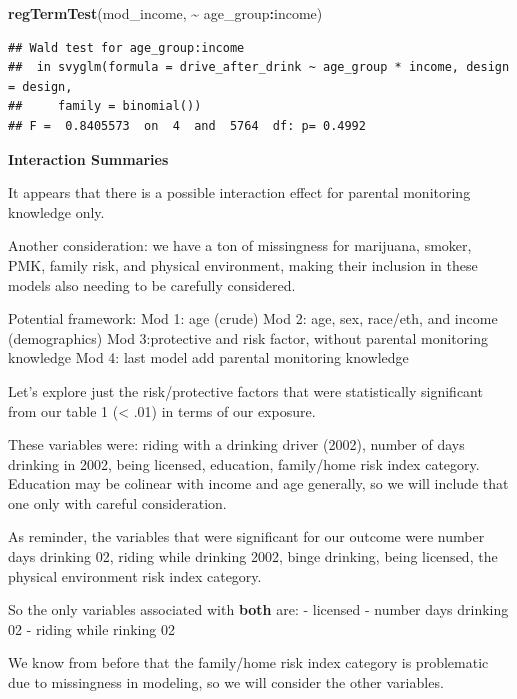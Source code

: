 \documentclass[
]{article}
\newenvironment{Shaded}{\begin{snugshade}}{\end{snugshade}}
\newcommand{\FunctionTok}[1]{\textcolor[rgb]{0.13,0.29,0.53}{\textbf{#1}}}
\newcommand{\NormalTok}[1]{#1}
\newcommand{\SpecialCharTok}[1]{\textcolor[rgb]{0.81,0.36,0.00}{\textbf{#1}}}
\begin{document}
\begin{Shaded}
\begin{Highlighting}[]
  \FunctionTok{regTermTest}\NormalTok{(mod\_income, }\SpecialCharTok{\textasciitilde{}}\NormalTok{ age\_group}\SpecialCharTok{:}\NormalTok{income)}
\end{Highlighting}
\end{Shaded}

\begin{verbatim}
## Wald test for age_group:income
##  in svyglm(formula = drive_after_drink ~ age_group * income, design = design, 
##     family = binomial())
## F =  0.8405573  on  4  and  5764  df: p= 0.4992
\end{verbatim}

\textbf{Interaction Summaries}

It appears that there is a possible interaction effect for parental
monitoring knowledge only.

Another consideration: we have a ton of missingness for marijuana,
smoker, PMK, family risk, and physical environment, making their
inclusion in these models also needing to be carefully considered.

Potential framework: Mod 1: age (crude) Mod 2: age, sex, race/eth, and
income (demographics) Mod 3:protective and risk factor, without parental
monitoring knowledge Mod 4: last model add parental monitoring knowledge

Let's explore just the risk/protective factors that were statistically
significant from our table 1 (\textless{} .01) in terms of our exposure.

These variables were: riding with a drinking driver (2002), number of
days drinking in 2002, being licensed, education, family/home risk index
category. Education may be colinear with income and age generally, so we
will include that one only with careful consideration.

As reminder, the variables that were significant for our outcome were
number days drinking 02, riding while drinking 2002, binge drinking,
being licensed, the physical environment risk index category.

So the only variables associated with \textbf{both} are: - licensed -
number days drinking 02 - riding while rinking 02

We know from before that the family/home risk index category is
problematic due to missingness in modeling, so we will consider the
other variables.
\end{document}
